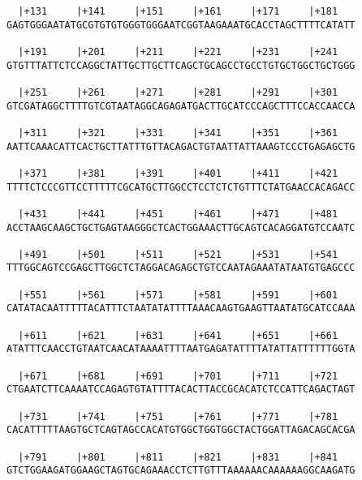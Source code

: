 \documentclass{article}
\begin{document}
\begin{Verbatim}
  |+131     |+141     |+151     |+161     |+171     |+181   
GAGTGGGAATATGCGTGTGTGGGTGGGAATCGGTAAGAAATGCACCTAGCTTTTCATATT
                                                            
  |+191     |+201     |+211     |+221     |+231     |+241   
GTGTTTATTCTCCAGGCTATTGCTTGCTTCAGCTGCAGCCTGCCTGTGCTGGCTGCTGGG
                                                            
  |+251     |+261     |+271     |+281     |+291     |+301   
GTCGATAGGCTTTTGTCGTAATAGGCAGAGATGACTTGCATCCCAGCTTTCCACCAACCA
                                                            
  |+311     |+321     |+331     |+341     |+351     |+361   
AATTCAAACATTCACTGCTTATTTGTTACAGACTGTAATTATTAAAGTCCCTGAGAGCTG
                                                            
  |+371     |+381     |+391     |+401     |+411     |+421   
TTTTCTCCCGTTCCTTTTTCGCATGCTTGGCCTCCTCTCTGTTTCTATGAACCACAGACC
                                                            
  |+431     |+441     |+451     |+461     |+471     |+481   
ACCTAAGCAAGCTGCTGAGTAAGGGCTCACTGGAAACTTGCAGTCACAGGATGTCCAATC
                                                            
  |+491     |+501     |+511     |+521     |+531     |+541   
TTTGGCAGTCCGAGCTTGGCTCTAGGACAGAGCTGTCCAATAGAAATATAATGTGAGCCC
                                                            
  |+551     |+561     |+571     |+581     |+591     |+601   
CATATACAATTTTTACATTTCTAATATATTTTAAACAAGTGAAGTTAATATGCATCCAAA
                                                            
  |+611     |+621     |+631     |+641     |+651     |+661   
ATATTTCAACCTGTAATCAACATAAAATTTTAATGAGATATTTTATATTATTTTTTGGTA
                                                            
  |+671     |+681     |+691     |+701     |+711     |+721   
CTGAATCTTCAAAATCCAGAGTGTATTTTACACTTACCGCACATCTCCATTCAGACTAGT
                                                            
  |+731     |+741     |+751     |+761     |+771     |+781   
CACATTTTTAAGTGCTCAGTAGCCACATGTGGCTGGTGGCTACTGGATTAGACAGCACGA
                                                            
  |+791     |+801     |+811     |+821     |+831     |+841   
GTCTGGAAGATGGAAGCTAGTGCAGAAACCTCTTGTTTAAAAAACAAAAAAGGCAAGATG
                                                            

\end{Verbatim}
\end{document}
